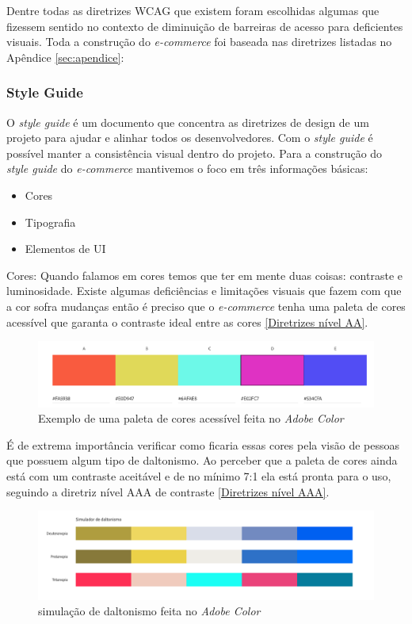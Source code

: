 {Dentre todas as diretrizes WCAG \cite{WCAG} que existem foram escolhidas algumas que fizessem sentido no contexto de diminuição de barreiras de acesso para deficientes visuais. Toda a construção do \textit{e-commerce} foi baseada nas diretrizes listadas no Apêndice \ref{sec:apendice}: 
\
}

\newpage
\subsubsection{Style Guide}
{O \textit{style guide} \cite{STYLE} é um documento que concentra as diretrizes de design de um projeto para ajudar e alinhar todos os desenvolvedores. Com o \textit{style guide} é possível manter a consistência visual dentro do projeto. Para a construção do \textit{style guide} do \textit{e-commerce} mantivemos o foco em três informações básicas:
\begin{itemize}
\item Cores
\item Tipografia
\item Elementos de UI
\end{itemize}

\vspace*{20px}
Cores:  Quando falamos em cores temos que ter em mente duas coisas: contraste e luminosidade. Existe algumas deficiências e limitações visuais que fazem com que a cor sofra mudanças então é preciso que o \textit{e-commerce} tenha uma paleta de cores acessível que garanta o contraste ideal entre as cores \ref{Diretrizes nível AA}. 
\begin{figure}[ht]
  		\centering
        \includegraphics[width=1.0\textwidth]{images/paleta_de_cores_acessiveis.png}
        \caption{Exemplo de uma paleta de cores acessível feita no \textit{Adobe Color}}
\end{figure}  
 
\vspace*{50px}
É de extrema importância verificar como ficaria essas cores pela visão de pessoas que possuem algum tipo de daltonismo. Ao perceber que a paleta de cores ainda está com um contraste aceitável e de no mínimo 7:1 ela está pronta para o uso, seguindo a diretriz nível AAA de contraste \ref{Diretrizes nível AAA}. 
 \begin{figure}[ht]
        \centering
    	\includegraphics[width=1.0\textwidth]{images/paleta_daltonismo.png}
        \caption{simulação de daltonismo feita no \textit{Adobe Color}}
\end{figure}  


}
